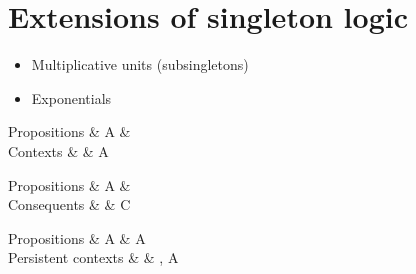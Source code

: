 \section{Extensions of singleton logic}\label{sec:singleton-logic:extensions}

\begin{itemize}
\item Multiplicative units (subsingletons)
\item Exponentials
\end{itemize}

\begin{syntax*}
  Propositions & A & \dotsb \mid \one \\
  Contexts & \sctx & A \mid \sctxe
\end{syntax*}


\begin{syntax*}
  Propositions & A & \dotsb \mid \bot \\
  Conseq\relax uents & \cseq & C \mid \cseqe
\end{syntax*}

\begin{inferences}
  \infer[\rrule{\bot}]{\slseq{\sctx |- \bot}}{
    \slseq{\sctx |- \cseqe}}
  \and
  \infer[\lrule{\bot}]{\slseq{\bot |- \cseqe}}{}
\end{inferences}

\begin{syntax*}
  Propositions & A & \dotsb \mid \bang A \\
  Persistent contexts & \uctx & \uctxe \mid \uctx, A
\end{syntax*}


